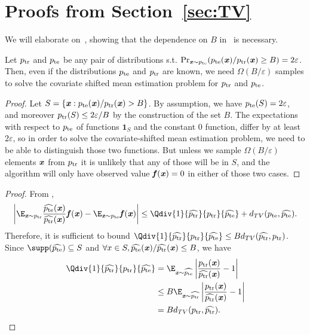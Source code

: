 \section{Proofs from Section~\ref{sec:TV}}\label{sec:ProofsTV}

We will elaborate on~, showing that the dependence on $B$ in~ is necessary.
\begin{lemma}
    Let $p_{\mathrm{tr}}$ and $p_{\mathrm{te}}$ be any pair of distributions s.t. $\Pr_{\boldsymbol{\mathit{x}} \sim p_{\mathrm{te}}}(p_{\mathrm{te}}(\boldsymbol{\mathit{x}})/p_{\mathrm{tr}}(\boldsymbol{\mathit{x}}) \geq B) = 2\varepsilon$. Then, even if the distributions $p_{\mathrm{te}}$ and $p_{\mathrm{tr}}$ are known, we need $\Omega(B/\varepsilon)$ samples to solve the covariate shifted mean estimation problem for $p_{\mathrm{tr}}$ and $p_{\mathrm{te}}$.
\end{lemma}
\begin{proof}
Let $S = \{ \boldsymbol{\mathit{x}} : p_{\mathrm{te}}(\boldsymbol{\mathit{x}}) / p_{\mathrm{tr}}(\boldsymbol{\mathit{x}}) > B \}$. By assumption, we have $p_{\mathrm{te}}(S) = 2\varepsilon$, and moreover $p_{\mathrm{tr}}(S) \leq 2 \varepsilon / B$ by the construction of the set $B$. The expectations with respect to $p_{\mathrm{te}}$ of functions $\mathbf{1}_S$ and the constant $0$ function, differ by at least $2\varepsilon$, so in order to solve the covariate-shifted mean estimation problem, we need to be able to distinguish those two functions. But unless we sample $\Omega(B/\varepsilon)$ elements $\boldsymbol{\mathit{x}}$ from $p_{\mathrm{tr}}$ it is unlikely that any of those will be in $S$, and the algorithm will only have observed value $\boldsymbol{\mathit{f}}(\boldsymbol{\mathit{x}}) = 0$ in either of those two cases.
\end{proof}



\ApproximationBiasTV*



\begin{proof}
From ,
\[
\left|\E_{\xx\sim \ptr} \frac{\widehat{\pte}(\xx)}{\widehat{\ptr}(\xx)} \ff(\xx) - \E_{\xx\sim \pte} \ff(\xx)\right| \leq \Qdiv{1}{\widehat{\ptr}}{\ptr}{\widehat{\pte}} + d_{TV}({\pte},\widehat{\pte}).
\]
Therefore, it is sufficient to bound $\Qdiv{1}{\widehat{\ptr}}{\ptr}{\widehat{\pte}} \leq B d_{TV}(\widehat{\ptr}, \ptr)$. Since $\supp (\widehat{\pte}) \subseteq S$ and $\forall x\in S,\widehat{p_{\mathrm{te}}}(\boldsymbol{\mathit{x}}) / \widehat{p_{\mathrm{tr}}}(\boldsymbol{\mathit{x}}) \leq B$, we have
\begin{align*}
   \Qdiv{1}{\widehat{\ptr}}{\ptr}{\widehat{\pte}} &= \E_{\xx\sim \widehat{\pte}} \left| \frac{\ptr(\xx)}{\widehat{\ptr}(\xx)} - 1\right|\\
   &\leq B \E_{\xx\sim \widehat{\ptr}} \left| \frac{\ptr(\xx)}{\widehat{\ptr}(\xx)}- 1 \right|\\
   &= B d_{TV}({\ptr}, \widehat{\ptr}).
\end{align*}
\end{proof}




